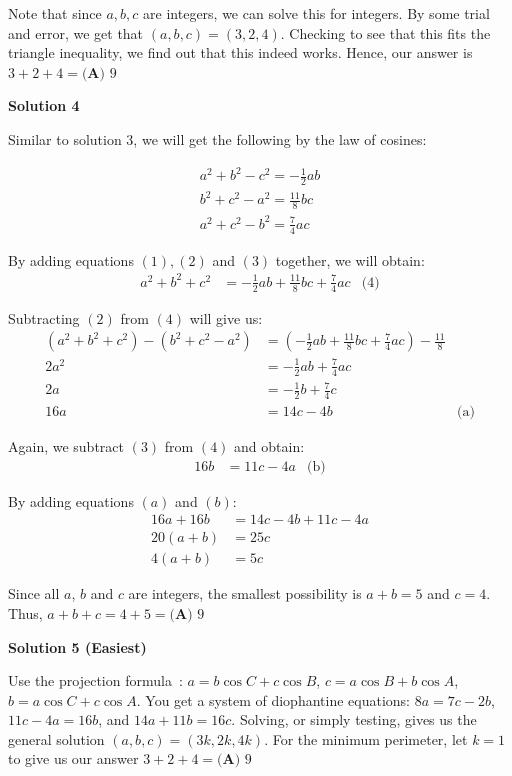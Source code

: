 \begin{enumerate}
 Note that since $a, b, c$ are integers, we can solve this for integers. By some trial and error, we get that $(a,b,c) = (3,2,4)$. Checking to see that this fits the triangle inequality, we find out that this indeed works. Hence, our answer is $3+2+4 = \boxed{\textbf{(A) } 9}$




\textbf{Solution 4}

Similar to solution 3, we will get the following by the law of cosines:

 
 \begin{align} a^2 + b^2 - c^2 = - \frac{1}{2} ab\\ b^2 + c^2 - a^2 = \frac{11}{8} bc\\ a^2 + c^2 - b^2 = \frac{7}{4} ac \end{align}

 By adding equations $(1), (2)$ and $(3)$ together, we will obtain:
 \begin{align*} a^2 + b^2 + c^2 &= - \frac{1}{2} ab + \frac{11}{8} bc + \frac{7}{4} ac & \text{(4)} \end{align*}


 Subtracting $(2)$ from $(4)$ will give us:
 \begin{align*} (a^2 + b^2 + c^2) - (b^2 + c^2 - a^2) &= (- \frac{1}{2} ab + \frac{11}{8} bc + \frac{7}{4} ac) - \frac{11}{8}\\ 2a^2 &= - \frac{1}{2} ab + \frac{7}{4} ac\\ 2a &= - \frac{1}{2} b + \frac{7}{4} c\\ 16a &= 14c - 4b & \text{(a)} \end{align*}


 Again, we subtract $(3)$ from $(4)$ and obtain:
 \begin{align*} 16b &= 11c - 4a & \text{(b)} \end{align*}


 By adding equations $(a)$ and $(b)$:
 \begin{align*} 16a + 16b &= 14c - 4b + 11c - 4a\\ 20(a+b) &= 25c\\ 4(a+b) &= 5c \end{align*}


 Since all $a$, $b$ and $c$ are integers, the smallest possibility is $a+b=5$ and $c=4$. Thus, $a+b+c=4+5=\boxed{\textbf{(A) } 9}$




\textbf{Solution 5 (Easiest)}

Use the projection formula : $a = b\cos{C} + c\cos{B}$, $c = a\cos{B} + b\cos{A}$, $b = a\cos{C} + c\cos{A}$. You get a system of diophantine equations: $8a = 7c - 2b$, $11c - 4a = 16b$, and $14a + 11b = 16c$. Solving, or simply testing, gives us the general solution $(a, b, c) = (3k, 2k, 4k)$. For the minimum perimeter, let $k = 1$ to give us our answer $3 + 2 + 4 = \boxed{\textbf{(A) } 9}$




\end{enumerate}
